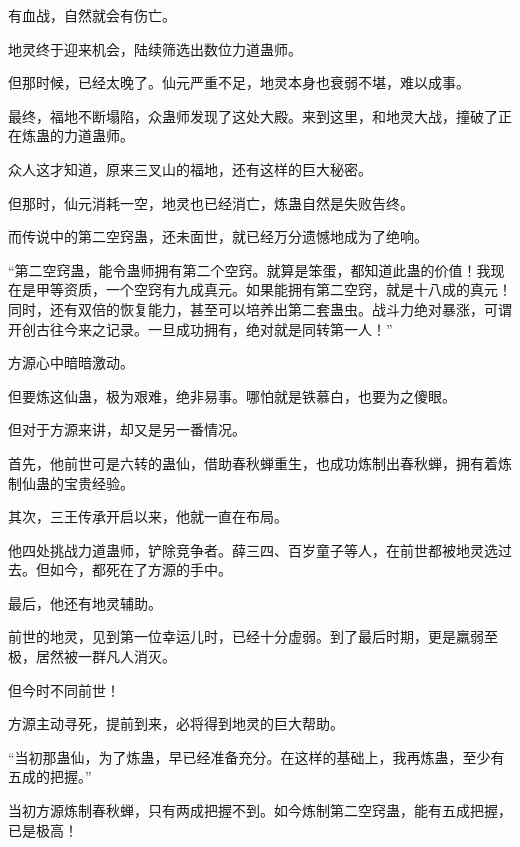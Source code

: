 \begin{this_body}
有血战，自然就会有伤亡。

地灵终于迎来机会，陆续筛选出数位力道蛊师。

但那时候，已经太晚了。仙元严重不足，地灵本身也衰弱不堪，难以成事。

最终，福地不断塌陷，众蛊师发现了这处大殿。来到这里，和地灵大战，撞破了正在炼蛊的力道蛊师。

众人这才知道，原来三叉山的福地，还有这样的巨大秘密。

但那时，仙元消耗一空，地灵也已经消亡，炼蛊自然是失败告终。

而传说中的第二空窍蛊，还未面世，就已经万分遗憾地成为了绝响。

“第二空窍蛊，能令蛊师拥有第二个空窍。就算是笨蛋，都知道此蛊的价值！我现在是甲等资质，一个空窍有九成真元。如果能拥有第二空窍，就是十八成的真元！同时，还有双倍的恢复能力，甚至可以培养出第二套蛊虫。战斗力绝对暴涨，可谓开创古往今来之记录。一旦成功拥有，绝对就是同转第一人！”

方源心中暗暗激动。

但要炼这仙蛊，极为艰难，绝非易事。哪怕就是铁慕白，也要为之傻眼。

但对于方源来讲，却又是另一番情况。

首先，他前世可是六转的蛊仙，借助春秋蝉重生，也成功炼制出春秋蝉，拥有着炼制仙蛊的宝贵经验。

其次，三王传承开启以来，他就一直在布局。

他四处挑战力道蛊师，铲除竞争者。薛三四、百岁童子等人，在前世都被地灵选过去。但如今，都死在了方源的手中。

最后，他还有地灵辅助。

前世的地灵，见到第一位幸运儿时，已经十分虚弱。到了最后时期，更是羸弱至极，居然被一群凡人消灭。

但今时不同前世！

方源主动寻死，提前到来，必将得到地灵的巨大帮助。

“当初那蛊仙，为了炼蛊，早已经准备充分。在这样的基础上，我再炼蛊，至少有五成的把握。”

当初方源炼制春秋蝉，只有两成把握不到。如今炼制第二空窍蛊，能有五成把握，已是极高！

\end{this_body}

